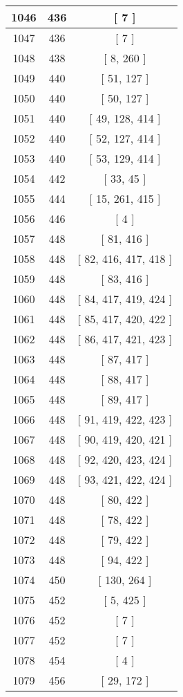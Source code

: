 \begin{center}
\begin{longtable}[H]{|| c c c ||}
\hline
1046 & 436 & [ 7 ] \\ 
\hline
1047 & 436 & [ 7 ] \\ 
\hline
1048 & 438 & [ 8, 260 ] \\ 
\hline
1049 & 440 & [ 51, 127 ] \\ 
\hline
1050 & 440 & [ 50, 127 ] \\ 
\hline
1051 & 440 & [ 49, 128, 414 ] \\ 
\hline
1052 & 440 & [ 52, 127, 414 ] \\ 
\hline
1053 & 440 & [ 53, 129, 414 ] \\ 
\hline
1054 & 442 & [ 33, 45 ] \\ 
\hline
1055 & 444 & [ 15, 261, 415 ] \\ 
\hline
1056 & 446 & [ 4 ] \\ 
\hline
1057 & 448 & [ 81, 416 ] \\ 
\hline
1058 & 448 & [ 82, 416, 417, 418 ] \\ 
\hline
1059 & 448 & [ 83, 416 ] \\ 
\hline
1060 & 448 & [ 84, 417, 419, 424 ] \\ 
\hline
1061 & 448 & [ 85, 417, 420, 422 ] \\ 
\hline
1062 & 448 & [ 86, 417, 421, 423 ] \\ 
\hline
1063 & 448 & [ 87, 417 ] \\ 
\hline
1064 & 448 & [ 88, 417 ] \\ 
\hline
1065 & 448 & [ 89, 417 ] \\ 
\hline
1066 & 448 & [ 91, 419, 422, 423 ] \\ 
\hline
1067 & 448 & [ 90, 419, 420, 421 ] \\ 
\hline
1068 & 448 & [ 92, 420, 423, 424 ] \\ 
\hline
1069 & 448 & [ 93, 421, 422, 424 ] \\ 
\hline
1070 & 448 & [ 80, 422 ] \\ 
\hline
1071 & 448 & [ 78, 422 ] \\ 
\hline
1072 & 448 & [ 79, 422 ] \\ 
\hline
1073 & 448 & [ 94, 422 ] \\ 
\hline
1074 & 450 & [ 130, 264 ] \\ 
\hline
1075 & 452 & [ 5, 425 ] \\ 
\hline
1076 & 452 & [ 7 ] \\ 
\hline
1077 & 452 & [ 7 ] \\ 
\hline
1078 & 454 & [ 4 ] \\ 
\hline
1079 & 456 & [ 29, 172 ] \\ 

\end{longtable}
\end{center}
